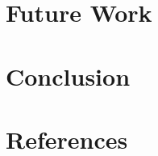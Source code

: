 \documentclass{article}
\begin{document}
\begin{multicols}{2}
\section{Future Work}
\section{Conclusion}
\section{References}


\end{multicols}
\end{document}
